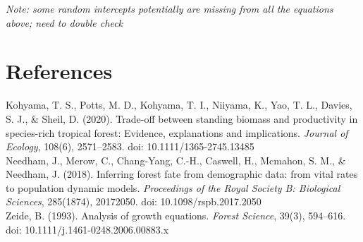 \documentclass[12pt,a4paper]{article}
\begin{document}
\textit{Note: some random intercepts potentially are missing from all the equations above; need to double check}

\section{References}

\noindent Kohyama, T. S., Potts, M. D., Kohyama, T. I., Niiyama, K., Yao, T. L., Davies, S. J., \& Sheil, D. (2020). Trade-off between standing biomass and productivity in species-rich tropical forest: Evidence, explanations and implications. \textit{Journal of Ecology}, 108(6), 2571–2583. doi: 10.1111/1365-2745.13485
\\

\noindent Needham, J., Merow, C., Chang-Yang, C.-H., Caswell, H., Mcmahon, S. M., \& Needham, J. (2018). Inferring forest fate from demographic data: from vital rates to population dynamic models. \textit{Proceedings of the Royal Society B: Biological Sciences}, 285(1874), 20172050. doi: 10.1098/rspb.2017.2050
\\

\noindent Zeide, B. (1993). Analysis of growth equations. \textit{Forest Science}, 39(3), 594–616. doi: 10.1111/j.1461-0248.2006.00883.x
\end{document}
